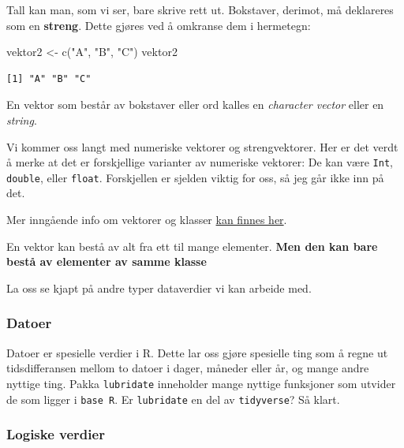 \documentclass[
  letterpaper,
  DIV=11,
  numbers=noendperiod]{scrartcl}
\newenvironment{Shaded}{\begin{snugshade}}{\end{snugshade}}
\newcommand{\FunctionTok}[1]{\textcolor[rgb]{0.28,0.35,0.67}{#1}}
\newcommand{\NormalTok}[1]{\textcolor[rgb]{0.00,0.23,0.31}{#1}}
\newcommand{\OtherTok}[1]{\textcolor[rgb]{0.00,0.23,0.31}{#1}}
\newcommand{\StringTok}[1]{\textcolor[rgb]{0.13,0.47,0.30}{#1}}
\begin{document}
Tall kan man, som vi ser, bare skrive rett ut. Bokstaver, derimot, må
deklareres som en \textbf{streng}. Dette gjøres ved å omkranse dem i
hermetegn:

\begin{Shaded}
\begin{Highlighting}[]
\NormalTok{vektor2 }\OtherTok{\textless{}{-}} \FunctionTok{c}\NormalTok{(}\StringTok{"A"}\NormalTok{, }\StringTok{"B"}\NormalTok{, }\StringTok{"C"}\NormalTok{)}
\NormalTok{vektor2}
\end{Highlighting}
\end{Shaded}

\begin{verbatim}
[1] "A" "B" "C"
\end{verbatim}

En vektor som består av bokstaver eller ord kalles en \emph{character
vector} eller en \emph{string}.

Vi kommer oss langt med numeriske vektorer og strengvektorer. Her er det
verdt å merke at det er forskjellige varianter av numeriske vektorer: De
kan være \texttt{Int}, \texttt{double}, eller \texttt{float}.
Forskjellen er sjelden viktig for oss, så jeg går ikke inn på det.

Mer inngående info om vektorer og klasser
\href{https://r02pro.github.io/vector.html}{kan finnes her}.

En vektor kan bestå av alt fra ett til mange elementer. \textbf{Men den
kan bare bestå av elementer av samme klasse}

La oss se kjapt på andre typer dataverdier vi kan arbeide med.

\hypertarget{datoer}{%
\subsubsection{Datoer}\label{datoer}}

Datoer er spesielle verdier i R. Dette lar oss gjøre spesielle ting som
å regne ut tidsdifferansen mellom to datoer i dager, måneder eller år,
og mange andre nyttige ting. Pakka \texttt{lubridate} inneholder mange
nyttige funksjoner som utvider de som ligger i \texttt{base\ R}. Er
\texttt{lubridate} en del av \texttt{tidyverse}? Så klart.

\hypertarget{logiske-verdier}{%
\subsubsection{Logiske verdier}\label{logiske-verdier}}
\end{document}

